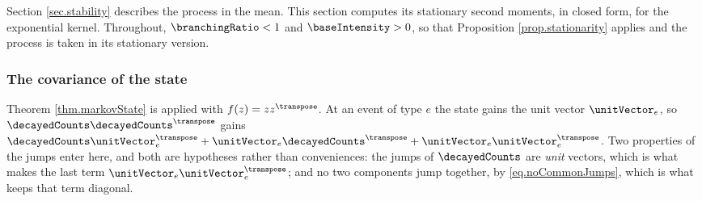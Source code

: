 Section \ref{sec.stability} describes the process in the mean.
This section computes its stationary second moments,
in closed form, for the exponential kernel.
Throughout, $\branchingRatio < 1$ and $\baseIntensity > 0$,
so that Proposition \ref{prop.stationarity} applies
and the process is taken in its stationary version.

\subsubsection{The covariance of the state}

Theorem \ref{thm.markovState} is applied with $f(z) = z z^{\transpose}$.
At an event of type $e$ the state gains the unit vector $\unitVector_e$,
so $\decayedCounts\decayedCounts^{\transpose}$ gains
$\decayedCounts \unitVector_e^{\transpose}
+ \unitVector_e \decayedCounts^{\transpose}
+ \unitVector_e \unitVector_e^{\transpose}$.
Two properties of the jumps enter here, and both are hypotheses rather than conveniences:
the jumps of $\decayedCounts$ are \emph{unit} vectors,
which is what makes the last term $\unitVector_e \unitVector_e^{\transpose}$;
and no two components jump together, by \eqref{eq.noCommonJumps},
which is what keeps that term diagonal.

